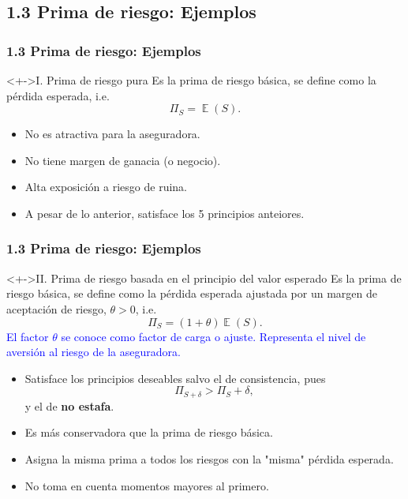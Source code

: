 \documentclass[cjk,t,compress]{beamer}
\newcommand{\field}[1]{\mathbb{#1}}
\newcommand{\expec}{\operatorname{\field{E}}}
\begin{document}
\subsection{1.3 Prima de riesgo: Ejemplos}
\begin{frame}[fragile]
	\frametitle{1.3 Prima de riesgo: Ejemplos}
	\scriptsize  	
		
		\vspace{0.2cm}
		\begin{block}<+->{I. Prima de riesgo pura}
		\vspace{0.1cm}
		Es la prima de riesgo b\'asica, se define como la p\'erdida esperada, i.e.
		\begin{equation}
			\Pi_S = \expec(S).
		\end{equation}
		
		\begin{itemize}
		  \item No es atractiva para la aseguradora.
		  \item No tiene margen de ganacia (o negocio).
		  \item Alta exposici\'on a riesgo de ruina.
		  \item A pesar de lo anterior, satisface los 5 principios anteiores. 
		\end{itemize}
		\end{block}  		

\end{frame}

\begin{frame}[fragile]
	\frametitle{1.3 Prima de riesgo: Ejemplos}
	\scriptsize  	
		
		\vspace{0.2cm}
		\begin{block}<+->{II. Prima de riesgo basada en el principio del valor esperado}
		\vspace{0.1cm}
		Es la prima de riesgo b\'asica, se define como la p\'erdida esperada ajustada por un margen de aceptaci\'on de riesgo, $\theta>0$, i.e.
		\begin{equation}
			\Pi_S = (1+\theta)\expec(S).
		\end{equation}
		\textcolor{blue}{El factor $\theta$ se conoce como factor de carga o ajuste. Representa el nivel de aversión al riesgo de la aseguradora.}
		
		\begin{itemize}
		  \item Satisface los principios deseables salvo el de consistencia, pues
		  $$\Pi_{S+\delta} > \Pi_{S}+\delta,$$
		  y el de {\bf no estafa}.
		  \item Es m\'as conservadora que la prima de riesgo b\'asica.
		  \item Asigna la misma prima a todos los riesgos con la "misma" p\'erdida esperada. 
		  \item No toma en cuenta momentos mayores al primero.
		\end{itemize}
		\end{block}  		

\end{frame}
\end{document}
